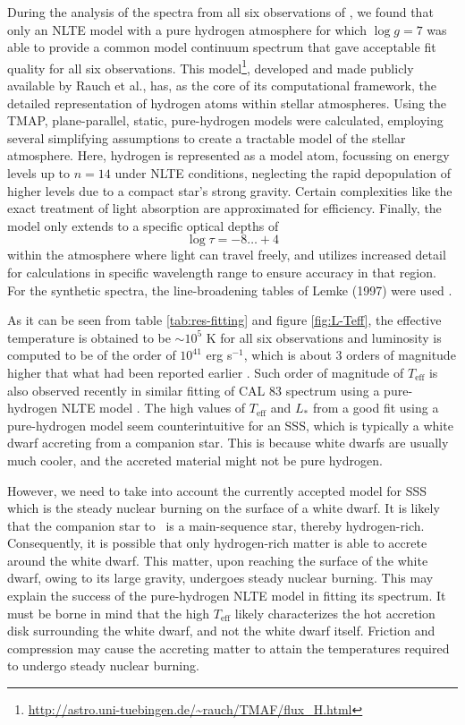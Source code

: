 		    During the analysis of the spectra from all six observations of \source, we found that only an NLTE model with a pure hydrogen atmosphere for which $\log{g}=7$ was able to provide a common model continuum spectrum that gave acceptable fit quality for all six observations. This model\footnote{\url{http://astro.uni-tuebingen.de/~rauch/TMAF/flux_H.html}}, developed and made publicly available by Rauch et al., has, as the core of its computational framework, the detailed representation of hydrogen atoms within stellar atmospheres. Using the TMAP,  plane-parallel, static, pure-hydrogen models were calculated, employing several simplifying assumptions to create a tractable model of the stellar atmosphere. Here, hydrogen is represented as a model atom, focussing on energy levels up to $n=14$ under NLTE conditions, neglecting the rapid depopulation of higher levels due to a compact star's strong gravity. Certain complexities like the exact treatment of light absorption are approximated for efficiency. Finally, the model only extends to a specific optical depths of
		    $$\log{\tau}=-8\dots+4$$
		    within the atmosphere where light can travel freely, and utilizes increased detail for calculations in specific wavelength range to ensure accuracy in that region. For the synthetic spectra, the line-broadening tables of Lemke (1997) were used \cite{lemke1997extended}.
		    
		    As it can be seen from table \ref{tab:res-fitting} and figure \ref{fig:L-Teff}, the effective temperature is obtained to be $\sim 10^5$ K for all six observations and luminosity is computed to be of the order of $10^{41}$ erg s$^{-1}$, which is about 3 orders of magnitude higher that what had been reported earlier \cite{hartmann1999constraining}. Such order of magnitude of $T_\text{eff}$ is also observed recently in similar fitting of CAL 83 spectrum using a pure-hydrogen NLTE model \cite{stecchini2023revisiting}. The high values of $T_\text{eff}$ and $L_*$ from a good fit using a pure-hydrogen model seem counterintuitive for an SSS, which is typically a white dwarf accreting from a companion star. This is because white dwarfs are usually much cooler, and the accreted material might not be pure hydrogen.
    
    		However, we need to take into account the currently accepted model for SSS which is the steady nuclear burning on the surface of a white dwarf. It is likely that the companion star to \source\ is a main-sequence star, thereby hydrogen-rich. Consequently, it is possible that only hydrogen-rich matter is able to accrete around the white dwarf. This matter, upon reaching the surface of the white dwarf, owing to its large gravity, undergoes steady nuclear burning. This may explain the success of the pure-hydrogen NLTE model in fitting its spectrum. It must be borne in mind that the high $T_\text{eff}$ likely characterizes the hot accretion disk surrounding the white dwarf, and not the white dwarf itself. Friction and compression may cause the accreting matter to attain the temperatures required to undergo steady nuclear burning.
    		

